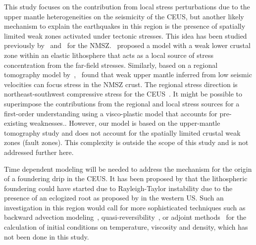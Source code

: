 \documentclass[draft,linenumbers]{agujournal2018}
\begin{document}
 This study focuses on the contribution from local stress perturbations due to the upper mantle heterogeneities on the seismicity of the CEUS, but another likely mechanism to explain the earthquakes in this region is the presence of spatially limited weak zones activated under tectonic stresses. This idea has been studied previously by~\citet{Kenner_2000a} and~\citet{zhan2016stress} for the NMSZ.~\citet{Kenner_2000a} proposed a model with a weak lower crustal zone within an elastic lithosphere that acts as a local source of stress concentration from the far-field stresses. Similarly, based on a regional tomography model by~\citet{pollitz2014seismic},~\citet{zhan2016stress} found that weak upper mantle inferred from low seismic velocities can focus stress in the NMSZ crust. The regional stress direction is northeast-southwest compressive stress for the CEUS~\citep{zoback1989tectonic}. It might be possible to superimpose the contributions from the regional and local stress sources for a first-order understanding using a visco-plastic model that accounts for pre-existing weaknesses.. However, our model is based on the upper-mantle tomography study and does not account for the spatially limited crustal weak zones (fault zones). This complexity is outside the scope of this study and is not addressed further here.     
     
Time dependent modeling will be needed to address the mechanism for the origin of a foundering drip in the CEUS. It has been proposed by \cite{Biryol_2016} that the lithospheric foundering could have started due to Rayleigh-Taylor instability due to the presence of an eclogized root as proposed by \citet{le2006mantle} in the western US. Such an investigation in this region would call for more sophisticated techniques such as backward advection modeling~\citep[e.g.,][]{conrad2003seismic}, quasi-reversibility~\citep{glivsovic2016new}, or adjoint methods~\citep[e.g.,][]{bunge2003mantle, liu2008reconstructing} for the calculation of initial conditions on temperature, viscosity and density, which has not been done in this study.
\end{document}
